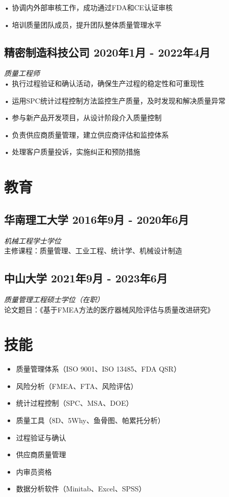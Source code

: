 \documentclass[a4paper,10pt]{article}
\begin{document}
• 协调内外部审核工作，成功通过FDA和CE认证审核

• 培训质量团队成员，提升团队整体质量管理水平

\subsection*{精密制造科技公司 \hfill 2020年1月 - 2022年4月}
\textit{ 质量工程师} \\
• 执行过程验证和确认活动，确保生产过程的稳定性和可重现性

• 运用SPC统计过程控制方法监控生产质量，及时发现和解决质量异常

• 参与新产品开发项目，从设计阶段介入质量控制

• 负责供应商质量管理，建立供应商评估和监控体系

• 处理客户质量投诉，实施纠正和预防措施

\section*{ 教育}

\subsection*{华南理工大学 \hfill 2016年9月 - 2020年6月}
\textit{机械工程学士学位}\\
主修课程：质量管理、工业工程、统计学、机械设计制造

\subsection*{中山大学 \hfill 2021年9月 - 2023年6月}
\textit{质量管理工程硕士学位（在职）}\\
论文题目：《基于FMEA方法的医疗器械风险评估与质量改进研究》

\section*{ 技能}
\begin{center}
    \begin{itemize}[label=, itemsep=-3pt]
        \item 质量管理体系（ISO 9001、ISO 13485、FDA QSR）
        \item 风险分析（FMEA、FTA、风险评估）
        \item 统计过程控制（SPC、MSA、DOE）
        \item 质量工具（8D、5Why、鱼骨图、帕累托分析）
        \item 过程验证与确认
        \item 供应商质量管理
        \item 内审员资格
        \item 数据分析软件（Minitab、Excel、SPSS）
    \end{itemize}
\end{center}
\end{document}
